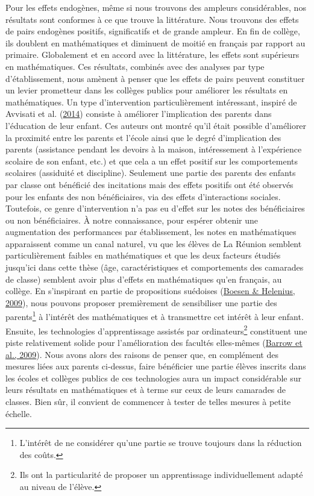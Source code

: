 \documentclass[
]{book}
\begin{document}
\quad Pour les effets endogènes, même si nous trouvons des ampleurs considérables, nos résultats sont conformes à ce que trouve la littérature. Nous trouvons des effets de pairs endogènes positifs, significatifs et de grande ampleur. En fin de collège, ils doublent en mathématiques et diminuent de moitié en français par rapport au primaire. Globalement et en accord avec la littérature, les effets sont supérieurs en mathématiques. Ces résultats, combinés avec des analyses par type d'établissement, nous amènent à penser que les effets de pairs peuvent constituer un levier prometteur dans les collèges publics pour améliorer les résultats en mathématiques. Un type d'intervention particulièrement intéressant, inspiré de Avvisati et al. (\protect\hyperlink{ref-AVV:eal:14}{2014}) consiste à améliorer l'implication des parents dans l'éducation de leur enfant. Ces auteurs ont montré qu'il était possible d'améliorer la proximité entre les parents et l'école ainsi que le degré d'implication des parents (assistance pendant les devoirs à la maison, intéressement à l'expérience scolaire de son enfant, etc.) et que cela a un effet positif sur les comportements scolaires (assiduité et discipline). Seulement une partie des parents des enfants par classe ont bénéficié des incitations mais des effets positifs ont été observés pour les enfants des non bénéficiaires, via des effets d'interactions sociales. Toutefois, ce genre d'intervention n'a pas eu d'effet sur les notes des bénéficiaires ou non bénéficiaires. À notre connaissance, pour espérer obtenir une augmentation des performances par établissement, les notes en mathématiques apparaissent comme un canal naturel, vu que les élèves de La Réunion semblent particulièrement faibles en mathématiques et que les deux facteurs étudiés jusqu'ici dans cette thèse (âge, caractéristiques et comportements des camarades de classe) semblent avoir plus d'effets en mathématiques qu'en français, au collège. En s'inspirant en partie de propositions suédoises (\protect\hyperlink{ref-BOE:HEL:09}{Boesen \& Helenius, 2009}), nous pouvons proposer premièrement de sensibiliser une partie des parents\footnote{L'intérêt de ne considérer qu'une partie se trouve toujours dans la réduction des coûts.} à l'intérêt des mathématiques et à transmettre cet intérêt à leur enfant. Ensuite, les technologies d'apprentissage assistés par ordinateurs\footnote{Ils ont la particularité de proposer un apprentissage individuellement adapté au niveau de l'élève.} constituent une piste relativement solide pour l'amélioration des facultés elles-mêmes (\protect\hyperlink{ref-BAR:eal:09}{Barrow et al., 2009}). Nous avons alors des raisons de penser que, en complément des mesures liées aux parents ci-dessus, faire bénéficier une partie élèves inscrits dans les écoles et collèges publics de ces technologies aura un impact considérable sur leurs résultats en mathématiques et à terme sur ceux de leurs camarades de classes. Bien sûr, il convient de commencer à tester de telles mesures à petite échelle.
\end{document}
